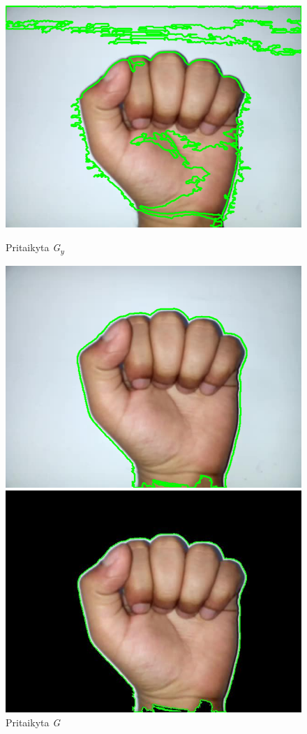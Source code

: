 \documentclass{VUMIFInfKursinis}
\begin{document}
\begin{figure}[H]
\begin{minipage}{.3\textwidth}
		\centering
		\includegraphics[width=.8\linewidth]{img/A-sobelY}
		\caption{Pritaikyta \textit{G\textsubscript{y}}}
		\label{img:a-sobelY}
	\end{minipage}\hspace{\fill}%
	\begin{minipage}{.3\textwidth}
		\centering
		\includegraphics[width=.8\linewidth]{img/A-sobel}
		\caption{Pritaikyta \textit{G}}
		\label{img:a-sobel}
	\end{minipage}\hspace{\fill}%
	\begin{minipage}{.3\textwidth}
		\centering
		\includegraphics[width=.8\linewidth]{img/A-black}

\end{minipage}
\end{figure}
\end{document}
